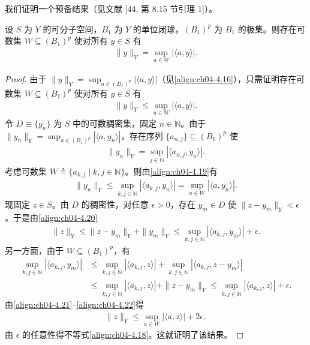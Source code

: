 \documentclass[../../main.tex]{subfiles}%
\begin{document}
我们证明一个预备结果（见文献 [44, 第 8.15 节引理 1]）。

\begin{proposition}\label{proposition:ch04-可数支撑范数}
设 $S$ 为 $Y$ 的可分子空间，$B_1$ 为 $Y$ 的单位闭球，$(B_1)^p$ 为 $B_1$ 的极集。则存在可数集 $W\subseteq(B_1)^p$ 使对所有 $y\in S$ 有
\begin{align}
\|y\|_Y=\sup_{a\in W}|\langle a,y\rangle|. \label{align:ch04-4.17}
\end{align}
\end{proposition}

\begin{proof}
由于 $\|y\|_Y=\sup_{a\in(B_1)^p}|\langle a,y\rangle|$（见\eqref{align:ch04-4.16}），只需证明存在可数集 $W\subseteq(B_1)^p$ 使对所有 $y\in S$ 有
\begin{align}
\|y\|_Y\leqslant\sup_{a\in W}|\langle a,y\rangle|. \label{align:ch04-4.18}
\end{align}
令 $D\equiv\{y_n\}$ 为 $S$ 中的可数稠密集，固定 $n\in\mathbb{N}$。由于 $\|y_n\|_Y=\sup_{a\in(B_1)^p}|\langle a,y_n\rangle|$，存在序列 $\{a_{n,j}\}\subseteq(B_1)^p$ 使
\begin{align}
\|y_n\|_Y=\sup_{j\in\mathbb{N}}|\langle a_{n,j},y_n\rangle|. \label{align:ch04-4.19}
\end{align}
考虑可数集 $W\triangleq \{a_{k,j}\mid k,j\in\mathbb{N}\}$。则由\eqref{align:ch04-4.19}有
\begin{align}
\|y_n\|_Y\leqslant\sup_{k,j\in\mathbb{N}}|\langle a_{k,j},y_n\rangle|=\sup_{a\in W}|\langle a,y_n\rangle|. \label{align:ch04-4.20}
\end{align}
现固定 $z\in S$。由 $D$ 的稠密性，对任意 $\epsilon>0$，存在 $y_m\in D$ 使 $\|z-y_m\|_Y<\epsilon$。于是由\eqref{align:ch04-4.20}
\begin{align}
\|z\|_Y\leqslant\|z-y_m\|_Y+\|y_m\|_Y\leqslant\sup_{k,j\in\mathbb{N}}|\langle a_{k,j},y_m\rangle|+\epsilon. \label{align:ch04-4.21}
\end{align}
另一方面，由于 $W\subseteq(B_1)^p$，有
\begin{align}
\sup_{k,j\in\mathbb{N}}|\langle a_{k,j},y_m\rangle|
&\leqslant\sup_{k,j\in\mathbb{N}}|\langle a_{k,j},z\rangle|+\sup_{k,j\in\mathbb{N}}|\langle a_{k,j},z-y_m\rangle|\nonumber\\
&\leqslant\sup_{k,j\in\mathbb{N}}|\langle a_{k,j},z\rangle|+\|z-y_m\|_Y\leqslant\sup_{k,j\in\mathbb{N}}|\langle a_{k,j},z\rangle|+\epsilon. \label{align:ch04-4.22}
\end{align}
由\eqref{align:ch04-4.21}--\eqref{align:ch04-4.22}得
\begin{align*}
\|z\|_Y\leqslant\sup_{a\in W}|\langle a,z\rangle|+2\epsilon,
\end{align*}
由 $\epsilon$ 的任意性得不等式\eqref{align:ch04-4.18}。这就证明了该结果。
\end{proof}
\end{document}
